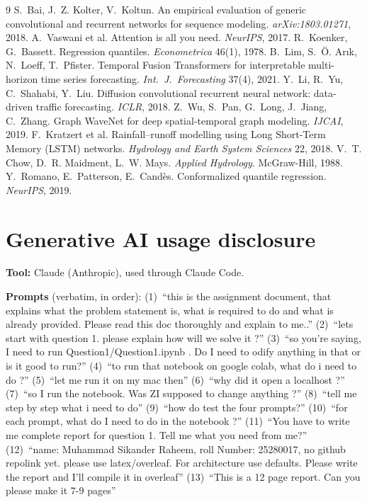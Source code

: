 \documentclass[11pt,a4paper]{article}
\begin{document}
{\small
\begin{thebibliography}{9}\setlength{\itemsep}{0pt}
 S.~Bai, J.~Z. Kolter, V.~Koltun. An empirical evaluation of generic convolutional and recurrent networks for sequence modeling. \emph{arXiv:1803.01271}, 2018.
 A.~Vaswani et al. Attention is all you need. \emph{NeurIPS}, 2017.
 R.~Koenker, G.~Bassett. Regression quantiles. \emph{Econometrica} 46(1), 1978.
 B.~Lim, S.~\"O. Ar{\i}k, N.~Loeff, T.~Pfister. Temporal Fusion Transformers for interpretable multi-horizon time series forecasting. \emph{Int.\ J.\ Forecasting} 37(4), 2021.
 Y.~Li, R.~Yu, C.~Shahabi, Y.~Liu. Diffusion convolutional recurrent neural network: data-driven traffic forecasting. \emph{ICLR}, 2018.
 Z.~Wu, S.~Pan, G.~Long, J.~Jiang, C.~Zhang. Graph WaveNet for deep spatial-temporal graph modeling. \emph{IJCAI}, 2019.
 F.~Kratzert et al. Rainfall--runoff modelling using Long Short-Term Memory (LSTM) networks. \emph{Hydrology and Earth System Sciences} 22, 2018.
 V.~T. Chow, D.~R. Maidment, L.~W. Mays. \emph{Applied Hydrology}. McGraw-Hill, 1988.
 Y.~Romano, E.~Patterson, E.~Cand\`es. Conformalized quantile regression. \emph{NeurIPS}, 2019.
\end{thebibliography}

\section*{Generative AI usage disclosure}
\textbf{Tool:} Claude (Anthropic), used through Claude Code.

\noindent\textbf{Prompts} (verbatim, in order):
(1)~``this is the assignment document, that explains what the problem statement is, what is required to do and what is already provided. Please read this doc thoroughly and explain to me..''
(2)~``lets start with question 1. please explain how will we solve it ?''
(3)~``so you're saying, I need to run Question1/Question1.ipynb . Do I need to odify anything in that or is it good to run?''
(4)~``to run that notebook on google colab, what do i need to do ?''
(5)~``let me run it on my mac then''
(6)~``why did it open a localhost ?''
(7)~``so I run the notebook. Was ZI supposed to change anything ?''
(8)~``tell me step by step what i need to do''
(9)~``how do test the four prompts?''
(10)~``for each prompt, what do I need to do in the notebook ?''
(11)~``You have to write me complete report for question 1. Tell me what you need from me?''
(12)~``name: Muhammad Sikander Raheem, roll Number: 25280017, no github repolink yet. please use latex/overleaf. For architecture use defaults. Please write the report and I'll compile it in overleaf''
(13)~``This is a 12 page report. Can you please make it 7-9 pages''

}
\end{document}
